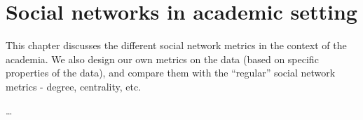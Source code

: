 \chapter{Social networks in academic setting}

This chapter discusses the different social network metrics in the context of the academia. We also design our own metrics on the data (based on specific properties of the data), and compare them with the ``regular'' social network metrics - degree, centrality, etc.

\dots
